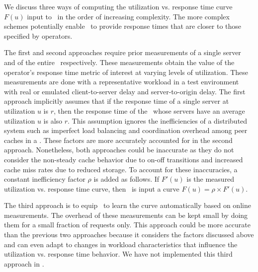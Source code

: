 We discuss three ways of computing the utilization vs. response time curve $F(u)$ input to \shrink\ in the order of increasing complexity. The more complex schemes potentially enable \shrink\ to provide response times that are closer to those specified by operators. 

The first and second approaches require prior measurements of a single server and of the entire \cdc\ respectively.
These measurements obtain the  value of the operator's response time metric of interest at varying levels of utilization.  These measurements are done with a representative workload in a test environment with real or emulated client-to-server delay and server-to-origin delay.  The first approach implicitly assumes that if the response time of a single server at utilization $u$ is $r$, then the response time of the \cdc\ whose servers have an average utilization $u$ is also $r$. This assumption ignores the inefficiencies of a distributed system such as imperfect load balancing and coordination overhead among peer caches in a \cdc. These factors are more accurately accounted for in the second approach. Nonetheless, both approaches could be inaccurate as they do not consider the non-steady cache behavior due to on-off transitions and increased cache miss rates due to reduced storage.  To account for these inaccuracies, a constant inefficiency factor $\rho$ is added as follows. If $F'(u)$ is the measured  utilization vs. response time curve, then \shrink\ is input a curve $F(u) = \rho \times F'(u)$.

The third approach is to equip \shrink\ to learn the curve automatically based on online measurements. The overhead of these measurements can be kept small by doing them for a small fraction of requests only. This approach could be more accurate than the previous two approaches because it considers the factors discussed above and can even adapt to changes in workload characteristics that influence the utilization vs. response time behavior. We have not implemented this third approach in \shrink. 






